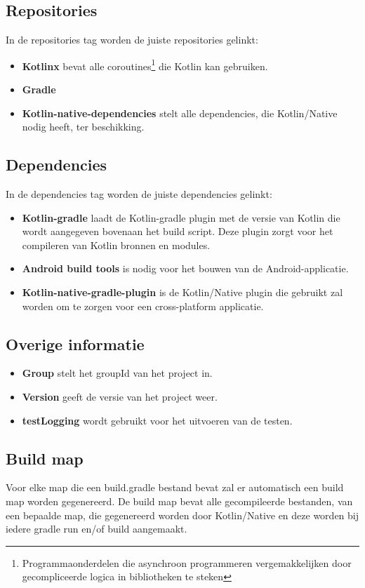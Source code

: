 \subsection{Repositories}
In de repositories tag worden de juiste repositories gelinkt:
\begin{itemize}
	\item \textbf{Kotlinx} bevat alle coroutines\footnote{Programmaonderdelen die asynchroon programmeren vergemakkelijken door gecompliceerde logica in bibliotheken te steken} die Kotlin kan gebruiken.
	\item \textbf{Gradle}
	\item \textbf{Kotlin-native-dependencies} stelt alle dependencies, die Kotlin/Native nodig heeft, ter beschikking.
\end{itemize}

\subsection{Dependencies}
In de dependencies tag worden de juiste dependencies gelinkt:
\begin{itemize}
	\item \textbf{Kotlin-gradle} laadt de Kotlin-gradle plugin met de versie van Kotlin die wordt aangegeven bovenaan het build script. Deze plugin zorgt voor het compileren van Kotlin bronnen en modules.
	\item \textbf{Android build tools} is nodig voor het bouwen van de Android-applicatie.
	\item \textbf{Kotlin-native-gradle-plugin} is de Kotlin/Native plugin die gebruikt zal worden om te zorgen voor een cross-platform applicatie.
\end{itemize}

\subsection{Overige informatie}
\label{sec:overige}
\begin{itemize}
	\item \textbf{Group} stelt het groupId van het project in.
	\item \textbf{Version} geeft de versie van het project weer.
	\item \textbf{testLogging} wordt gebruikt voor het uitvoeren van de testen.
\end{itemize}

\subsection{Build map}
Voor elke map die een build.gradle bestand bevat zal er automatisch een build map worden gegenereerd. De build map bevat alle gecompileerde bestanden, van een bepaalde map, die gegenereerd worden door Kotlin/Native en deze worden bij iedere gradle run en/of build aangemaakt.

